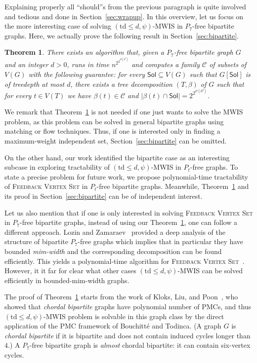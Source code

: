 \documentclass[11pt,a4paper]{article}
\newtheorem{theorem}{Theorem}[section]
\theoremstyle{definition}
\newcommand{\Oh}{\mathcal{O}}
\def\Sol{\mathsf{Sol}}
\begin{document}
Explaining properly all ``should''s from the previous paragraph is quite involved
and tedious
and done in Section~\ref{sec:wrapup}. In this overview, let us focus
on the more interesting case of solving $(\mathrm{td} \leq d,\psi)$-\textsc{MWIS}
in $P_7$-free bipartite graphs.
Here, we actually prove the following result in Section~\ref{sec:bipartite}.
\begin{theorem}\label{thm:intro:bip}
There exists an algorithm that, given a $P_7$-free bipartite graph $G$ and an integer $d > 0$,
runs in time $n^{2^{2^{\Oh(d^3)}}}$ and computes a family $\mathcal{C}$ of subsets
of $V(G)$ with the following guarantee: 
for every $\Sol \subseteq V(G)$ such that $G[\Sol]$ is of treedepth at most $d$,
there exists
a tree decomposition $(T,\beta)$ of $G$ such that
for every $t \in V(T)$ we have $\beta(t) \in \mathcal{C}$ and 
$|\beta(t) \cap \Sol| = 2^{2^{\Oh(d^3)}}$. 
\end{theorem}
We remark that Theorem~\ref{thm:intro:bip} is not needed if one just
wants to solve the \textsc{MWIS} problem, 
as this problem can be solved in general bipartite graphs using matching or flow techniques.
Thus, if one is interested only in finding a maximum-weight independent set, Section~\ref{sec:bipartite} can be omitted.

On the other hand, our work identified the bipartite case as an interesting
subcase in exploring tractability of $(\mathrm{td} \leq d, \psi)$-\textsc{MWIS}
in $P_t$-free graphs. To state a precise problem for future work, we propose
polynomial-time tractability of \textsc{Feedback Vertex Set} in $P_t$-free
bipartite graphs.
Meanwhile, Theorem~\ref{thm:intro:bip}
and its proof in Section~\ref{sec:bipartite} can be of independent interest. 

Let us also mention that if one is only interested in solving \textsc{Feedback Vertex Set} in $P_7$-free bipartite graphs, instead of using our  Theorem~\ref{thm:intro:bip}, one can follow a different approach.
Lozin and Zamaraev~\cite{DBLP:journals/ejc/LozinZ17} provided a deep analysis of the structure of bipartite $P_7$-free graphs which implies that in particular they have bounded \emph{mim-width} and the corresponding decomposition can be found efficiently. This yields a polynomial-time algorithm for \textsc{Feedback Vertex Set}~\cite{DBLP:conf/soda/BergougnouxDJ23}.
However, it it far for clear what other cases $(\mathrm{td} \leq d, \psi)$-\textsc{MWIS} can be solved efficiently in bounded-mim-width graphs.


The proof of Theorem~\ref{thm:intro:bip}
starts from the work of Kloks, Liu, and Poon~\cite{kloks2012feedback}, who showed that \emph{chordal bipartite} graphs have polynomial number
of PMCs, and thus $(\mathrm{td} \leq d,\psi)$-\textsc{MWIS} problem is solvable
in this graph class by the direct application of the PMC framework of Bouchitt\'e and Todinca. (A graph $G$ is \emph{chordal bipartite} if it is bipartite
and does not contain induced cycles longer than $4$.)
A $P_7$-free bipartite graph is \emph{almost} chordal bipartite: it can contain
six-vertex cycles. 
\end{document}
